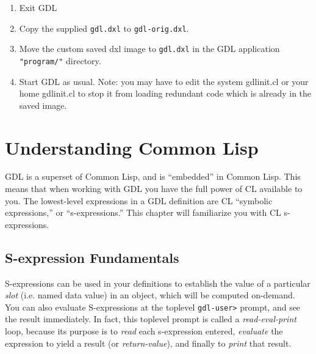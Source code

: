 \documentclass [11pt]{book}
\begin{document}
\begin{enumerate}

\item Exit GDL

\item Copy the supplied \texttt{gdl.dxl} to \texttt{gdl-orig.dxl}.

\item Move the custom saved dxl image to \texttt{gdl.dxl} in the GDL application \texttt{"program/"} directory.

\item Start GDL as usual. Note: you may have to edit the system gdlinit.cl or your home gdlinit.cl
to stop it from loading redundant code which is already in the saved image.

\end{enumerate}



\chapter{Understanding Common Lisp}

\label{chap:understandingcommonlisp}



GDL is a superset of Common Lisp, and is ``embedded'' in
Common Lisp. This means that when working with GDL you have the full
power of CL available to you. The lowest-level expressions in a GDL
definition are CL ``symbolic expressions,'' or ``s-expressions.''
This chapter will familiarize you with CL s-expressions.



\section{S-expression Fundamentals}

\label{sec:s-expressionfundamentals}



S-expressions can be used in your definitions to establish
the value of a particular \emph{slot} (i.e. named data value) in an object, which will be
computed on-demand. You can also evaluate S-expressions at the
toplevel \texttt{gdl-user\textgreater} prompt, and see the result immediately. In fact, this toplevel prompt is called a \emph{read-eval-print} loop, because its purpose is to \emph{read} each s-expression  entered, \emph{evaluate} the expression to yield a result (or \emph{return-value}), and finally to \emph{print} that result.
\end{document}
